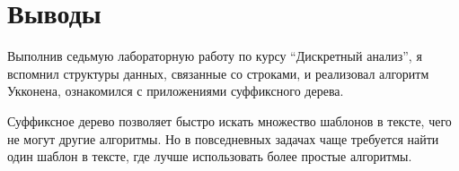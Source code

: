  
\section{Выводы}
Выполнив седьмую лабораторную работу по курсу \enquote{Дискретный анализ}, я вспомнил структуры данных, связанные со строками, и реализовал алгоритм Укконена, ознакомился с приложениями суффиксного дерева.

Суффиксное дерево позволяет быстро искать множество шаблонов в тексте, чего не могут другие алгоритмы. Но в повседневных задачах чаще требуется найти один шаблон в тексте, где лучше использовать более простые алгоритмы.
\pagebreak